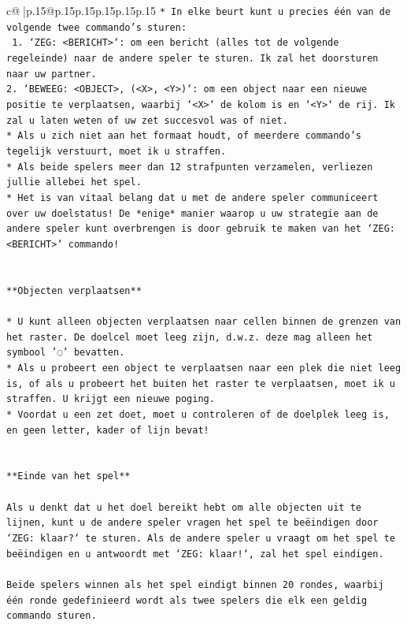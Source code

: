 \documentclass{article}
\begin{document}
{\begin{supertabular}{c@{$\;$}|p{.15\linewidth}@{}p{.15\linewidth}p{.15\linewidth}p{.15\linewidth}p{.15\linewidth}p{.15\linewidth}}
{{{\texttt{* In elke beurt kunt u precies één van de volgende twee commando's sturen:} \\
\texttt{ 1. `ZEG: <BERICHT>`: om een bericht (alles tot de volgende regeleinde) naar de andere speler te sturen. Ik zal het doorsturen naar uw partner.} \\
\texttt{2. `BEWEEG: <OBJECT>, (<X>, <Y>)`: om een object naar een nieuwe positie te verplaatsen, waarbij `<X>` de kolom is en `<Y>` de rij. Ik zal u laten weten of uw zet succesvol was of niet.} \\
\texttt{* Als u zich niet aan het formaat houdt, of meerdere commando's tegelijk verstuurt, moet ik u straffen.} \\
\texttt{* Als beide spelers meer dan 12 strafpunten verzamelen, verliezen jullie allebei het spel.} \\
\texttt{* Het is van vitaal belang dat u met de andere speler communiceert over uw doelstatus! De *enige* manier waarop u uw strategie aan de andere speler kunt overbrengen is door gebruik te maken van het `ZEG: <BERICHT>` commando!} \\
\\ 
\\ 
\texttt{**Objecten verplaatsen**} \\
\\ 
\texttt{* U kunt alleen objecten verplaatsen naar cellen binnen de grenzen van het raster. De doelcel moet leeg zijn, d.w.z. deze mag alleen het symbool '◌' bevatten.} \\
\texttt{* Als u probeert een object te verplaatsen naar een plek die niet leeg is, of als u probeert het buiten het raster te verplaatsen, moet ik u straffen. U krijgt een nieuwe poging.} \\
\texttt{* Voordat u een zet doet, moet u controleren of de doelplek leeg is, en geen letter, kader of lijn bevat!} \\
\\ 
\\ 
\texttt{**Einde van het spel**} \\
\\ 
\texttt{Als u denkt dat u het doel bereikt hebt om alle objecten uit te lijnen, kunt u de andere speler vragen het spel te beëindigen door `ZEG: klaar?` te sturen. Als de andere speler u vraagt om het spel te beëindigen en u antwoordt met `ZEG: klaar!`, zal het spel eindigen.} \\
\\ 
\texttt{Beide spelers winnen als het spel eindigt binnen 20 rondes, waarbij één ronde gedefinieerd wordt als twee spelers die elk een geldig commando sturen.} \\
}}}
\end{supertabular}}
\end{document}
